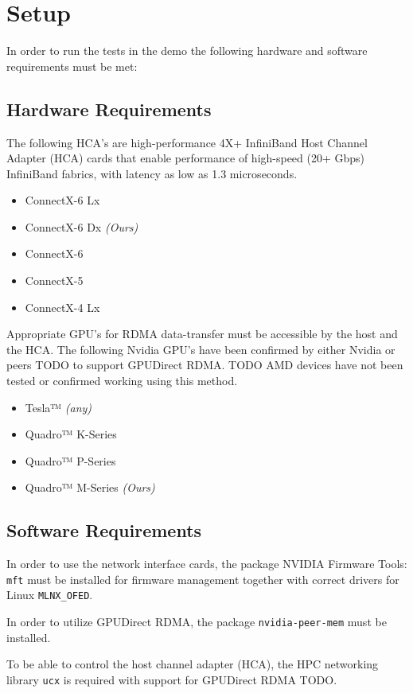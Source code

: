 \documentclass[a4paper,onecolumn]{article}
\begin{document}
\section{Setup}
In order to run the tests in the demo the following hardware and software requirements must be met:
\subsection{Hardware Requirements}
The following HCA's are high-performance 4X+ InfiniBand Host Channel Adapter
(HCA) cards that enable performance of high-speed (20+ Gbps) InfiniBand fabrics, with latency as low as 1.3 microseconds. 
\begin{itemize}
   \item ConnectX-6 Lx
   \item ConnectX-6 Dx  \textit{(Ours)}
   \item ConnectX-6
   \item ConnectX-5
   \item ConnectX-4 Lx
 \end{itemize}


Appropriate GPU's for RDMA data-transfer must be accessible by the host and the HCA. The following Nvidia GPU's have been confirmed by either Nvidia or peers TODO to support GPUDirect RDMA. TODO
AMD devices have not been tested or confirmed working using this method.

\begin{itemize}
   \item Tesla™ \textit{(any)}
   \item Quadro™ K-Series
   \item Quadro™ P-Series
   \item Quadro™ M-Series \textit{(Ours)}
 \end{itemize}

\subsection{Software Requirements}
In order to use the network interface cards, the package NVIDIA Firmware Tools: \verb|mft| must be installed for firmware management together with correct drivers for Linux \verb|MLNX_OFED|. 

In order to utilize GPUDirect RDMA, the package \verb|nvidia-peer-mem| must be installed.

To be able to control the host channel adapter (HCA), the HPC networking library \verb|ucx| is required with support for GPUDirect RDMA TODO.
\end{document}
